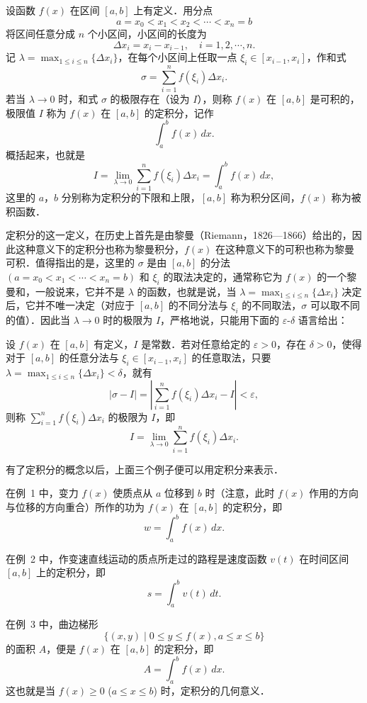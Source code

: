 \begin{definition}\label{def:7-1}
设函数 $f(x)$ 在区间 $[a,b]$ 上有定义．用分点
\[
a = x_0 < x_1 < x_2 < \cdots < x_n = b
\]
将区间任意分成 $n$ 个小区间，小区间的长度为
\[
\Delta x_i = x_i - x_{i-1}, \quad i = 1, 2, \cdots, n.
\]
记 $\lambda = \max_{1 \leqslant i \leqslant n}\{\Delta x_i\}$，在每个小区间上任取一点 $\xi_i \in [x_{i-1}, x_i]$，作和式
\[
\sigma = \sum_{i=1}^n f(\xi_i)\Delta x_i.
\]
若当 $\lambda \to 0$ 时，和式 $\sigma$ 的极限存在（设为 $I$），则称 $f(x)$ 在 $[a,b]$ 是可积的，极限值 $I$ 称为 $f(x)$ 在 $[a,b]$ 的定积分，记作
\[
\int_a^b f(x)\,dx.
\]
概括起来，也就是
\[
I = \lim_{\lambda \to 0}\sum_{i=1}^n f(\xi_i)\Delta x_i = \int_a^b f(x)\,dx,
\]
这里的 $a$，$b$ 分别称为定积分的下限和上限，$[a,b]$ 称为积分区间，$f(x)$ 称为被积函数．
\end{definition}

定积分的这一定义，在历史上首先是由黎曼（Riemann，1826---1866）给出的，因此这种意义下的定积分也称为黎曼积分，$f(x)$ 在这种意义下的可积也称为黎曼可积．值得指出的是，这里的 $\sigma$ 是由 $[a,b]$ 的分法 $(a = x_0 < x_1 < \cdots < x_n = b)$ 和 $\xi_i$ 的取法决定的，通常称它为 $f(x)$ 的一个黎曼和，一般说来，它并不是 $\lambda$ 的函数，也就是说，当 $\lambda = \max_{1 \leqslant i \leqslant n}\{\Delta x_i\}$ 决定后，它并不唯一决定（对应于 $[a,b]$ 的不同分法与 $\xi_i$ 的不同取法，$\sigma$ 可以取不同的值）．因此当 $\lambda \to 0$ 时的极限为 $I$，严格地说，只能用下面的 $\varepsilon$-$\delta$ 语言给出：

设 $f(x)$ 在 $[a,b]$ 有定义，$I$ 是常数．若对任意给定的 $\varepsilon > 0$，存在 $\delta > 0$，使得对于 $[a,b]$ 的任意分法与 $\xi_i \in [x_{i-1}, x_i]$ 的任意取法，只要 $\lambda = \max_{1 \leqslant i \leqslant n}\{\Delta x_i\} < \delta$，就有
\[
|\sigma - I| = \left|\sum_{i=1}^n f(\xi_i)\Delta x_i - I\right| < \varepsilon,
\]
则称 $\sum_{i=1}^n f(\xi_i)\Delta x_i$ 的极限为 $I$，即
\[
I = \lim_{\lambda \to 0}\sum_{i=1}^n f(\xi_i)\Delta x_i.
\]

有了定积分的概念以后，上面三个例子便可以用定积分来表示．

在例~1 中，变力 $f(x)$ 使质点从 $a$ 位移到 $b$ 时（注意，此时 $f(x)$ 作用的方向与位移的方向重合）所作的功为 $f(x)$ 在 $[a,b]$ 的定积分，即
\[
w = \int_a^b f(x)\,dx.
\]

在例~2 中，作变速直线运动的质点所走过的路程是速度函数 $v(t)$ 在时间区间 $[a,b]$ 上的定积分，即
\[
s = \int_a^b v(t)\,dt.
\]

在例~3 中，曲边梯形
\[
\{(x,y) \mid 0 \leqslant y \leqslant f(x), a \leqslant x \leqslant b\}
\]
的面积 $A$，便是 $f(x)$ 在 $[a,b]$ 的定积分，即
\[
A = \int_a^b f(x)\,dx.
\]
这也就是当 $f(x) \geqslant 0$ ($a \leqslant x \leqslant b$) 时，定积分的几何意义．

